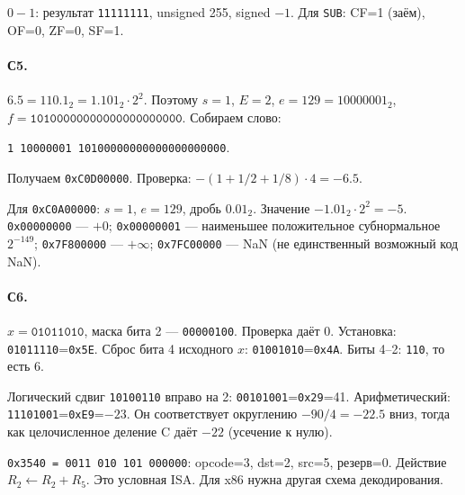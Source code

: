 $0-1$: результат \texttt{11111111}, unsigned 255, signed $-1$.
Для \texttt{SUB}: CF=1 (заём), OF=0, ZF=0, SF=1.

\paragraph{С5.}
$6.5=110.1_2=1.101_2\cdot2^2$. Поэтому $s=1$, $E=2$,
$e=129=10000001_2$, $f=\texttt{10100000000000000000000}$.
Собираем слово:
\begin{center}\texttt{1 10000001 10100000000000000000000}.\end{center}
Получаем \texttt{0xC0D00000}.
Проверка: $-(1+1/2+1/8)\cdot4=-6.5$.

Для \texttt{0xC0A00000}: $s=1$, $e=129$, дробь $0.01_2$.
Значение $-1.01_2\cdot2^2=-5$.
\texttt{0x00000000} --- $+0$;
\texttt{0x00000001} --- наименьшее положительное субнормальное $2^{-149}$;
\texttt{0x7F800000} --- $+\infty$;
\texttt{0x7FC00000} --- NaN (не единственный возможный код NaN).

\paragraph{С6.}
$x=\texttt{01011010}$, маска бита 2 --- \texttt{00000100}.
Проверка даёт 0. Установка: \texttt{01011110}=\texttt{0x5E}.
Сброс бита 4 исходного $x$: \texttt{01001010}=\texttt{0x4A}.
Биты 4--2: \texttt{110}, то есть 6.

Логический сдвиг \texttt{10100110} вправо на 2:
\texttt{00101001}=\texttt{0x29}=41.
Арифметический: \texttt{11101001}=\texttt{0xE9}=$-23$.
Он соответствует округлению $-90/4=-22.5$ вниз, тогда как целочисленное
деление C даёт $-22$ (усечение к нулю).

\texttt{0x3540 = 0011 010 101 000000}:
opcode=3, dst=2, src=5, резерв=0. Действие $R_2\gets R_2+R_5$.
Это условная ISA. Для x86 нужна другая схема декодирования.

